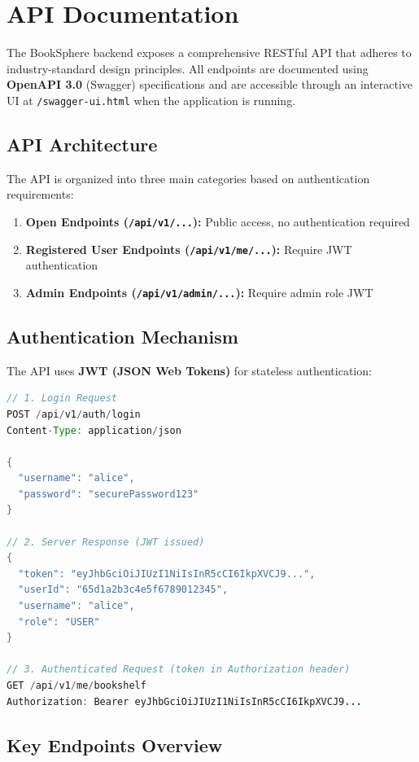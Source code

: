 \section{API Documentation}

The BookSphere backend exposes a comprehensive RESTful API that adheres to industry-standard design principles. All endpoints are documented using \textbf{OpenAPI 3.0} (Swagger) specifications and are accessible through an interactive UI at \texttt{/swagger-ui.html} when the application is running.

\subsection{API Architecture}
The API is organized into three main categories based on authentication requirements:

\begin{enumerate}
    \item \textbf{Open Endpoints (\texttt{/api/v1/...}):} Public access, no authentication required
    \item \textbf{Registered User Endpoints (\texttt{/api/v1/me/...}):} Require JWT authentication
    \item \textbf{Admin Endpoints (\texttt{/api/v1/admin/...}):} Require admin role JWT
\end{enumerate}

\subsection{Authentication Mechanism}
The API uses \textbf{JWT (JSON Web Tokens)} for stateless authentication:

\begin{lstlisting}[language=Java, caption={JWT Authentication Flow}]
// 1. Login Request
POST /api/v1/auth/login
Content-Type: application/json

{
  "username": "alice",
  "password": "securePassword123"
}

// 2. Server Response (JWT issued)
{
  "token": "eyJhbGciOiJIUzI1NiIsInR5cCI6IkpXVCJ9...",
  "userId": "65d1a2b3c4e5f6789012345",
  "username": "alice",
  "role": "USER"
}

// 3. Authenticated Request (token in Authorization header)
GET /api/v1/me/bookshelf
Authorization: Bearer eyJhbGciOiJIUzI1NiIsInR5cCI6IkpXVCJ9...
\end{lstlisting}

\subsection{Key Endpoints Overview}

